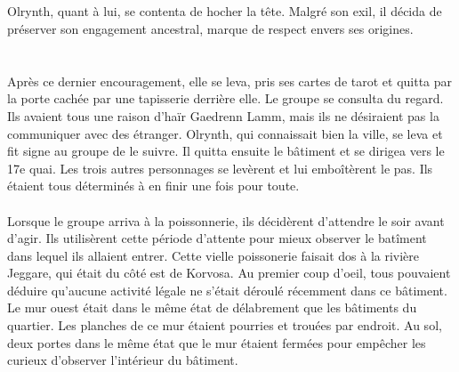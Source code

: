 \documentclass[main.tex]{subfiles}
\begin{document}
    \\
    \\
    \\
    \\
    Olrynth, quant à lui, se contenta de hocher la tête.
    Malgré son exil, il décida de préserver son engagement ancestral, marque de respect envers ses origines.\\
    \\
    \\
    Après ce dernier encouragement, elle se leva, pris ses cartes de tarot et quitta par la porte cachée par une tapisserie derrière elle.
    Le groupe se consulta du regard.
    Ils avaient tous une raison d'haïr Gaedrenn Lamm, mais ils ne désiraient pas la communiquer avec des étranger.
    Olrynth, qui connaissait bien la ville, se leva et fit signe au groupe de le suivre.
    Il quitta ensuite le bâtiment et se dirigea vers le 17e quai.
    Les trois autres personnages se levèrent et lui emboîtèrent le pas.
    Ils étaient tous déterminés à en finir une fois pour toute.\\
    \\
    Lorsque le groupe arriva à la poissonnerie, ils décidèrent d'attendre le soir avant d'agir.
    Ils utilisèrent cette période d'attente pour mieux observer le batîment dans lequel ils allaient entrer.
    Cette vielle poissonerie faisait dos à la rivière Jeggare, qui était du côté est de Korvosa.
    Au premier coup d'oeil, tous pouvaient déduire qu'aucune activité légale ne s'était déroulé récemment dans ce bâtiment.
    Le mur ouest était dans le même état de délabrement que les bâtiments du quartier.
    Les planches de ce mur étaient pourries et trouées par endroit.
    Au sol, deux portes dans le même état que le mur étaient fermées pour empêcher les curieux d'observer l'intérieur du bâtiment.
\end{document}
